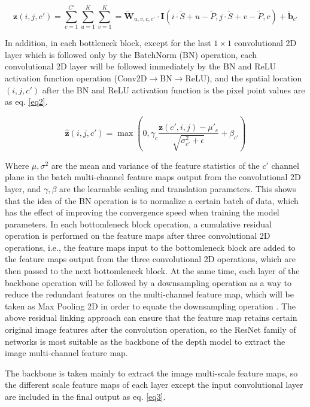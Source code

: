 \begin{equation}
\label{eq1}
  \boldsymbol{z}(i, j, c') = \sum^{C'}_{c=1} \sum^K_{u=1} \sum^K_{v=1} = \tilde{\mathbf{W}}_{u, v, c, c'} \cdot \mathbf{I}(i\cdot \tilde{S}+u-\tilde{P}, j\cdot \tilde{S}+v - \tilde{P}, c) + \tilde{\mathbf{b}}_{c'}
\end{equation}

In addition, in each bottleneck block, except for the last $1\times 1$ convolutional 2D layer which is followed only by the BatchNorm (BN) \cite{16} operation, each convolutional 2D layer will be followed immediately by the BN and ReLU activation function \cite{29} operation (Conv2D$\to$BN$\to$ReLU), and the spatial location $(i,j,c')$ after the BN and ReLU activation function is the pixel point values are as eq. \ref{eq2}.

\begin{equation}
\label{eq2}
  \hat{\boldsymbol{z}}(i, j, c') = \max \left( 0, \gamma_c \frac{\boldsymbol{z}(c', i, j) - \mu'_c}{\sqrt{\sigma^2_{c'}+\epsilon}}+\beta_{c'} \right)
\end{equation}

Where $\mu,\sigma^2$ are the mean and variance of the feature statistics of the $c'$ channel plane in the batch multi-channel feature maps output from the convolutional 2D layer, and $\gamma, \beta$ are the learnable scaling and translation parameters. This shows that the idea of the BN operation is to normalize a certain batch of data, which has the effect of improving the convergence speed when training the model parameters. In each bottomleneck block operation, a cumulative residual operation is performed on the feature maps after three convolutional 2D operations, i.e., the feature maps input to the bottomleneck block are added to the feature maps output from the three convolutional 2D operations, which are then passed to the next bottomleneck block. At the same time, each layer of the backbone operation will be followed by a downsampling operation as a way to reduce the redundant features on the multi-channel feature map, which will be taken as Max Pooling 2D in order to equate the downsampling operation \cite{14}. The above residual linking approach can ensure that the feature map retains certain original image features after the convolution operation, so the ResNet family of networks is most suitable as the backbone of the depth model to extract the image multi-channel feature map.

The backbone is taken mainly to extract the image multi-scale feature maps, so the different scale feature maps of each layer except the input convolutional layer are included in the final output as eq. \ref{eq3}.

